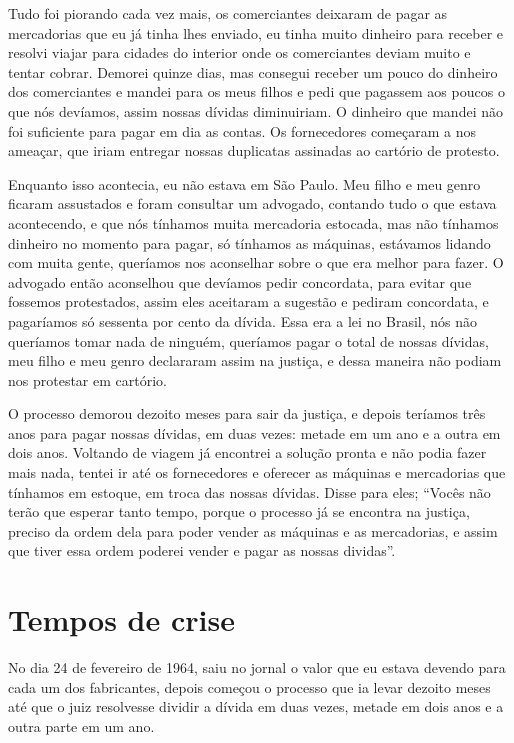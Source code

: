 Tudo foi piorando cada vez mais, os comerciantes deixaram de pagar as
mercadorias que eu já tinha lhes enviado, eu tinha muito dinheiro para
receber e resolvi viajar para cidades do interior onde os comerciantes
deviam muito e tentar cobrar. Demorei quinze dias, mas consegui receber
um pouco do dinheiro dos comerciantes e mandei para os meus filhos e
pedi que pagassem aos poucos o que nós devíamos, assim nossas dívidas
diminuiriam. O dinheiro que mandei não foi suficiente para pagar em dia
as contas. Os fornecedores começaram a nos ameaçar, que iriam entregar
nossas duplicatas assinadas ao cartório de protesto.

Enquanto isso acontecia, eu não estava em São Paulo. Meu filho e meu
genro ficaram assustados e foram consultar um advogado, contando tudo o
que estava acontecendo, e que nós tínhamos muita mercadoria estocada,
mas não tínhamos dinheiro no momento para pagar, só tínhamos as
máquinas, estávamos lidando com muita gente, queríamos nos aconselhar
sobre o que era melhor para fazer. O advogado então aconselhou que
devíamos pedir concordata, para evitar que fossemos protestados, assim
eles aceitaram a sugestão e pediram concordata, e pagaríamos só sessenta
por cento da dívida. Essa era a lei no Brasil, nós não queríamos tomar
nada de ninguém, queríamos pagar o total de nossas dívidas, meu filho e
meu genro declararam assim na justiça, e dessa maneira não podiam nos
protestar em cartório.

O processo demorou dezoito meses para sair da justiça, e depois teríamos
três anos para pagar nossas dívidas, em duas vezes: metade em um ano e a
outra em dois anos. Voltando de viagem já encontrei a solução pronta e
não podia fazer mais nada, tentei ir até os fornecedores e oferecer as
máquinas e mercadorias que tínhamos em estoque, em troca das nossas
dívidas. Disse para eles; ``Vocês não terão que esperar tanto tempo,
porque o processo já se encontra na justiça, preciso da ordem dela para
poder vender as máquinas e as mercadorias, e assim que tiver essa ordem
poderei vender e pagar as nossas dividas''.

\chapter{Tempos de crise}

No dia 24 de fevereiro de 1964, saiu no jornal o valor que eu estava
devendo para cada um dos fabricantes, depois começou o processo que ia
levar dezoito meses até que o juiz resolvesse dividir a dívida em duas
vezes, metade em dois anos e a outra parte em um ano.


